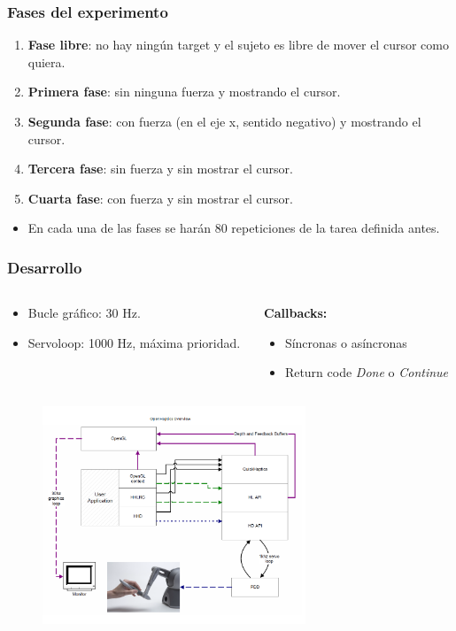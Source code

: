 \documentclass[pdf]{beamer}
\begin{document}
\begin{frame}
	\frametitle{Fases del experimento}

	\begin{enumerate}
		\item \textbf{Fase libre}: no hay ningún target y el sujeto es libre de mover el cursor como quiera. 
		\item \textbf{Primera fase}: sin ninguna fuerza y mostrando el cursor.
		\item \textbf{Segunda fase}: con fuerza (en el eje x, sentido negativo) y mostrando el cursor.
		\item \textbf{Tercera fase}: sin fuerza y sin mostrar el cursor.
		\item \textbf{Cuarta fase}: con fuerza y sin mostrar el cursor.
	\end{enumerate}	
	\begin{itemize}
		\item En cada una de las fases se harán 80 repeticiones de la tarea definida antes.
	\end{itemize}
\end{frame}



\begin{frame}
	\frametitle{Desarrollo}
	\begin{columns}
		\begin{column}{0.4\textwidth}
				\begin{itemize}
				\item Bucle gráfico: 30 Hz.
				\item Servoloop: 1000 Hz, máxima prioridad.
			\end{itemize}
		\end{column}
		\begin{column}{0.6\textwidth}
			\textbf{Callbacks:}
			\begin{itemize}
				\item Síncronas o asíncronas
				\item Return code \textit{Done} o \textit{Continue}
			\end{itemize}
		\end{column}
	\end{columns}
	
	\begin{figure}
	\centering
	\includegraphics[width=0.7\textwidth]{estructura}
	\end{figure}

\end{frame}
\end{document}
